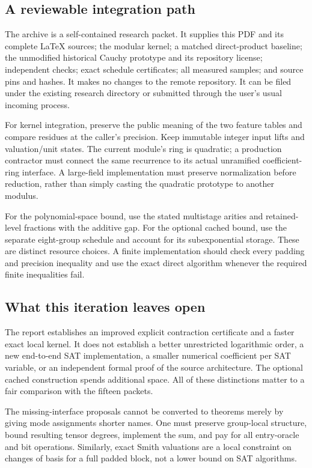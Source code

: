 \documentclass[11pt,letterpaper]{article}
\theoremstyle{definition}\newtheorem{definition}[theorem]{Definition}
\theoremstyle{remark}\newtheorem{remark}[theorem]{Remark}
\begin{document}
\subsection{A reviewable integration path}

The archive is a self-contained research packet. It supplies this PDF and
its complete LaTeX sources; the modular kernel; a matched direct-product
baseline; the unmodified historical Cauchy prototype and its repository
license; independent checks; exact schedule certificates; all measured
samples; and source pins and hashes. It makes no changes to the remote
repository. It can be filed under the existing research directory or
submitted through the user's usual incoming process.

For kernel integration, preserve the public meaning of the two feature
tables and compare residues at the caller's precision. Keep immutable
integer input lifts and valuation/unit states. The current module's ring
is quadratic; a production contractor must connect the same recurrence
to its actual unramified coefficient-ring interface. A large-field
implementation must preserve normalization before reduction, rather than
simply casting the quadratic prototype to another modulus.

For the polynomial-space bound, use the stated multistage arities and
retained-level fractions with the additive gap. For the optional cached
bound, use the separate eight-group schedule and account for its
subexponential storage. These are distinct resource choices. A finite
implementation should check every padding and precision inequality and
use the exact direct algorithm whenever the required finite inequalities
fail.

\subsection{What this iteration leaves open}

The report establishes an improved explicit contraction certificate and a
faster exact local kernel. It does not establish a better unrestricted
logarithmic order, a new end-to-end SAT implementation, a smaller numerical
coefficient per SAT variable, or an independent formal proof of the source
architecture. The optional cached construction spends additional space.
All of these distinctions matter to a fair comparison with the fifteen
packets.

The missing-interface proposals cannot be converted to theorems merely
by giving mode assignments shorter names. One must preserve group-local
structure, bound resulting tensor degrees, implement the sum, and pay for
all entry-oracle and bit operations. Similarly, exact Smith valuations
are a local constraint on changes of basis for a full padded block, not
a lower bound on SAT algorithms.
\end{document}
